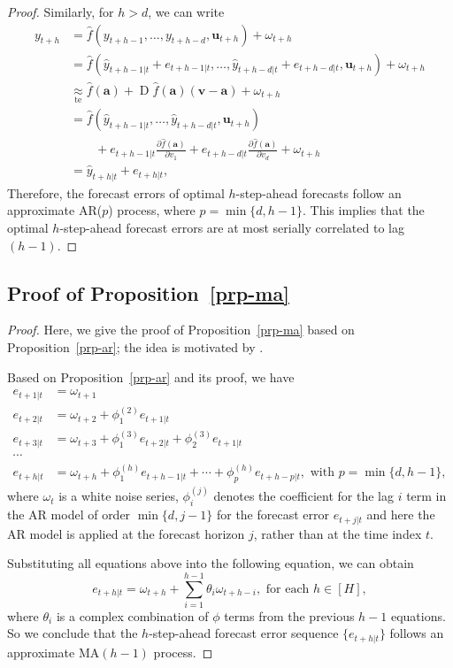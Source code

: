 \documentclass[
  11pt,
  12pt]{article}
\theoremstyle{plain}
\theoremstyle{remark}
\begin{document}
\begin{proof}
Similarly, for \(h > d\), we can write \begin{align*}
y_{t+h}
&= \hat{f}(y_{t+h-1},\dots,y_{t+h-d},\bm{u}_{t+h})+\omega_{t+h} \\
&= \hat{f}(\hat{y}_{t+h-1|t}+e_{t+h-1|t},\dots,\hat{y}_{t+h-d|t}+e_{t+h-d|t},\bm{u}_{t+h})+\omega_{t+h} \\
&\underset{\text{te}}{\approx} \hat{f}(\bm{a})+\operatorname{D}\hat{f}(\bm{a})(\bm{v}-\bm{a})+
\omega_{t+h} \\
&= \hat{f}(\hat{y}_{t+h-1|t},\dots,\hat{y}_{t+h-d|t},\bm{u}_{t+h}) \\
&\mbox{}\qquad +e_{t+h-1|t}\frac{\partial \hat{f}(\bm{a})}{\partial v_1}+e_{t+h-d|t}\frac{\partial \hat{f}(\bm{a})}{\partial v_{d}}+\omega_{t+h} \\
&= \hat{y}_{t+h|t}+e_{t+h|t},
\end{align*} Therefore, the forecast errors of optimal \(h\)-step-ahead
forecasts follow an approximate AR(\(p\)) process, where
\(p=\min\{d, h-1\}\). This implies that the optimal \(h\)-step-ahead
forecast errors are at most serially correlated to lag \((h-1)\).
\end{proof}

\subsection{\texorpdfstring{Proof of
Proposition~\ref{prp-ma}}{Proof of Proposition~}}\label{sec-proof_ma}

\begin{proof}
Here, we give the proof of Proposition~\ref{prp-ma} based on
Proposition~\ref{prp-ar}; the idea is motivated by \citet{sommer2023}.

Based on Proposition~\ref{prp-ar} and its proof, we have \begin{align*}
e_{t+1|t} &= \omega_{t+1} \\
e_{t+2|t} &= \omega_{t+2} + \phi_{1}^{(2)}e_{t+1|t} \\
e_{t+3|t} &= \omega_{t+3} + \phi_{1}^{(3)}e_{t+2|t} + \phi_{2}^{(3)}e_{t+1|t} \\
\cdots \\
e_{t+h|t} & = \omega_{t+h} + \phi_{1}^{(h)}e_{t+h-1|t} + \cdots + \phi_{p}^{(h)}e_{t+h-p|t}, \text{ with } p = \min\{d, h-1\},
\end{align*} where \(\omega_t\) is a white noise series,
\(\phi_i^{(j)}\) denotes the coefficient for the lag \(i\) term in the
AR model of order \(\min\{d, j-1\}\) for the forecast error
\(e_{t+j|t}\) and here the AR model is applied at the forecast horizon
\(j\), rather than at the time index \(t\).

Substituting all equations above into the following equation, we can
obtain \[
e_{t+h|t} = \omega_{t+h} + \sum_{i=1}^{h-1}\theta_{i}\omega_{t+h-i}, \text{ for each } h\in[H],
\] where \(\theta_{i}\) is a complex combination of \(\phi\) terms from
the previous \(h-1\) equations. So we conclude that the \(h\)-step-ahead
forecast error sequence \(\{e_{t+h|t}\}\) follows an approximate
MA\((h-1)\) process.
\end{proof}
\end{document}

